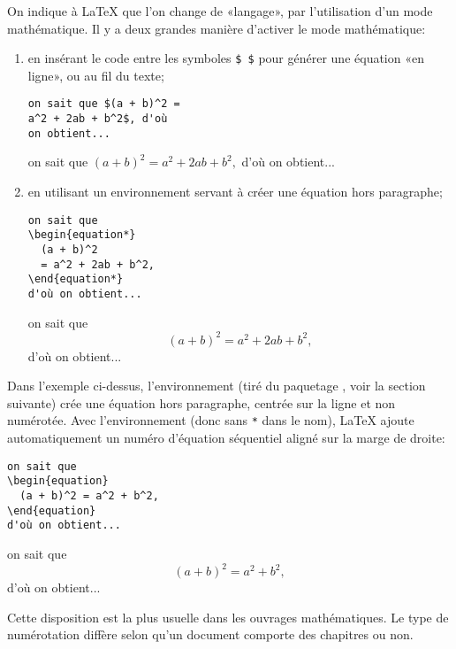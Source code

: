 On indique à {\LaTeX} que l'on change de «langage», par l'utilisation
d'un mode mathématique. Il y a deux grandes manière d'activer le mode
mathématique:
\begin{enumerate}
\item en insérant le code entre les symboles \verb=$ $= pour générer
  une équation «en ligne», ou au fil du texte;
  \begin{demo}
    \begin{texample}
\begin{lstlisting}
on sait que $(a + b)^2 =
a^2 + 2ab + b^2$, d'où
on obtient...
\end{lstlisting}
      \producing
      on sait que $(a + b)^2 = a^2 + 2ab + b^2,$ d'où on obtient...
    \end{texample}
  \end{demo}
\item en utilisant un environnement servant à créer une équation hors
  paragraphe;
  \begin{demo}
    \begin{texample}
\begin{lstlisting}
on sait que
\begin{equation*}
  (a + b)^2
  = a^2 + 2ab + b^2,
\end{equation*}
d'où on obtient...
\end{lstlisting}
      \producing
      on sait que
      \begin{equation*}
        (a + b)^2 = a^2 + 2ab + b^2,
      \end{equation*}
      d'où on obtient...
    \end{texample}
  \end{demo}
\end{enumerate}

Dans l'exemple ci-dessus, l'environnement  (tiré du
paquetage , voir la section suivante) crée une
équation hors paragraphe, centrée sur la ligne et non numérotée. Avec
l'environnement  (donc sans \verb=*= dans le nom),
{\LaTeX} ajoute automatiquement un numéro d'équation séquentiel aligné
sur la marge de droite:
\begin{demo}
  \begin{texample}
\begin{lstlisting}
on sait que
\begin{equation}
  (a + b)^2 = a^2 + b^2,
\end{equation}
d'où on obtient...
\end{lstlisting}
    \producing
    on sait que
    \begin{equation}
      (a + b)^2 = a^2 + b^2,
    \end{equation}
    d'où on obtient...
  \end{texample}
\end{demo}
Cette disposition est la plus usuelle dans les ouvrages mathématiques.
Le type de numérotation diffère selon qu'un document comporte des
chapitres ou non.

